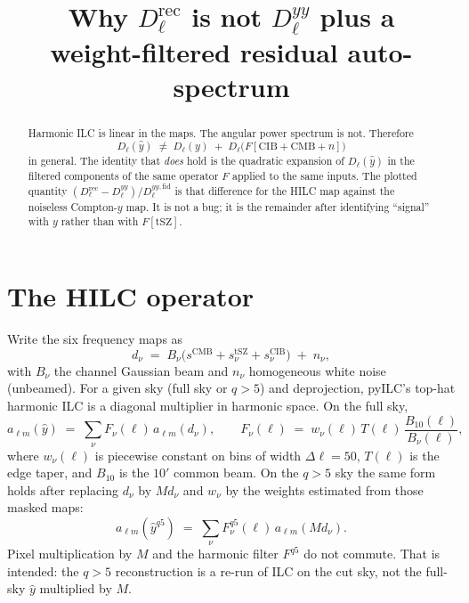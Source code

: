 \documentclass[11pt,a4paper]{article}
\title{Why \(D_\ell^{\mathrm{rec}}\) is not \(D_\ell^{yy}\) plus a\\
weight-filtered residual auto-spectrum}
\author{}
\date{}
\begin{document}
\maketitle

\begin{abstract}
Harmonic ILC is linear in the maps. The angular power spectrum is not.
Therefore
\[
D_\ell(\hat y)\;\neq\; D_\ell(y)\;+\;D_\ell\bigl(F[\mathrm{CIB}+\mathrm{CMB}+n]\bigr)
\]
in general. The identity that \emph{does} hold is the quadratic expansion of
\(D_\ell(\hat y)\) in the filtered components of the same operator \(F\)
applied to the same inputs. The plotted quantity
\((D_\ell^{\mathrm{rec}}-D_\ell^{yy})/D_\ell^{yy,\mathrm{fid}}\) is that
difference for the HILC map against the noiseless Compton-\(y\) map. It is
not a bug; it is the remainder after identifying ``signal'' with \(y\) rather
than with \(F[\mathrm{tSZ}]\).
\end{abstract}

\section{The HILC operator}

Write the six frequency maps as
\begin{equation}
  d_\nu \;=\; B_\nu\bigl(s^{\mathrm{CMB}}+s^{\mathrm{tSZ}}_\nu+s^{\mathrm{CIB}}_\nu\bigr)
  \;+\; n_\nu,
  \label{eq:d}
\end{equation}
with \(B_\nu\) the channel Gaussian beam and \(n_\nu\) homogeneous white
noise (unbeamed). For a given sky (full sky or \(q>5\)) and deprojection,
pyILC's top-hat harmonic ILC is a diagonal multiplier in harmonic space.
On the full sky,
\begin{equation}
  a_{\ell m}(\hat y)
  \;=\;
  \sum_\nu F_\nu(\ell)\, a_{\ell m}(d_\nu),
  \qquad
  F_\nu(\ell)
  \;=\;
  w_\nu(\ell)\, T(\ell)\, \frac{B_{10}(\ell)}{B_\nu(\ell)},
  \label{eq:F}
\end{equation}
where \(w_\nu(\ell)\) is piecewise constant on bins of width \(\Delta\ell=50\),
\(T(\ell)\) is the edge taper, and \(B_{10}\) is the \(10'\) common beam.
On the \(q>5\) sky the same form holds after replacing \(d_\nu\) by \(M d_\nu\)
and \(w_\nu\) by the weights estimated from those masked maps:
\begin{equation}
  a_{\ell m}(\hat y^{q5})
  \;=\;
  \sum_\nu F_\nu^{q5}(\ell)\, a_{\ell m}(M d_\nu).
  \label{eq:Fq5}
\end{equation}
Pixel multiplication by \(M\) and the harmonic filter \(F^{q5}\) do not
commute. That is intended: the \(q>5\) reconstruction is a re-run of ILC on
the cut sky, not the full-sky \(\hat y\) multiplied by \(M\).
\end{document}
